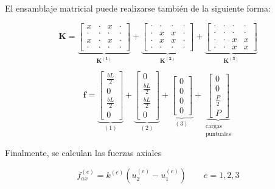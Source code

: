 \documentclass[12pt,letterpaper]{article}
\begin{document}
El ensamblaje matricial puede realizarse también de la siguiente forma:

\[
\mathbf{K} = \underbrace{\begin{bmatrix}
		x & \cdot & x & \cdot\\ 
		\cdot & \cdot & \cdot & \cdot\\ 
		x & \cdot & x & \cdot\\ 
		\cdot & \cdot & \cdot & \cdot
\end{bmatrix}}_{\mathbf{K^{(1)}}}
+
\underbrace{\begin{bmatrix}
		\cdot & \cdot & \cdot & \cdot\\ 
		\cdot & x & x & \cdot\\ 
		\cdot & x & x & \cdot\\ 
		\cdot & \cdot & \cdot & \cdot
\end{bmatrix}}_{\mathbf{K^{(2)}}}
+
\underbrace{\begin{bmatrix}
		\cdot & \cdot & \cdot & \cdot\\ 
		\cdot & \cdot & \cdot & \cdot\\ 
		\cdot & \cdot & x & x\\ 
		\cdot & \cdot & x & x
\end{bmatrix}}_{\mathbf{K^{(3)}}}
\]

\[
\mathbf{f} = \underbrace{\begin{bmatrix}
		\frac{bL}{2}\\ 
		0\\ 
		\frac{bL}{2}\\ 
		0
\end{bmatrix}}_{(1)}
+
\underbrace{\begin{bmatrix}
		0\\
		\frac{bL}{2}\\ 
		\frac{bL}{2}\\ 
		0
\end{bmatrix}}_{(2)}
+
\underbrace{\begin{bmatrix}
		0\\
		0\\ 
		0\\ 
		0
\end{bmatrix}}_{(3)}
+
\underbrace{\begin{bmatrix}
		0\\
		0\\ 
		\frac{P}{2}\\ 
		P
\end{bmatrix}}_{\substack{\text{cargas}\\ \text{puntuales}}}
\]

Finalmente, se calculan las fuerzas axiales

\[f_{ax}^{(e)} = k^{(e)} \left ( u_2^{(e)} - u_1^{(e)} \right ) \qquad e=1,2,3\]
	
\end{document}
